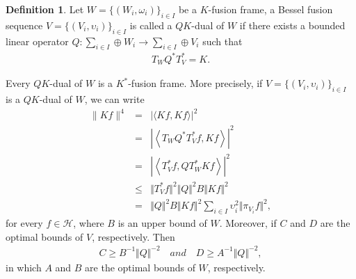 \documentclass{birkjour}
\theoremstyle{definition}
\newtheorem{defn}[thm]{Definition}
\theoremstyle{remark}
\numberwithin{equation}{section}
\begin{document}
\begin{defn}
Let  $W = \lbrace (W_{i}, \omega_{i})\rbrace_{i\in I}$   be a  $K$-fusion frame, 
 a Bessel fusion sequence $V=\lbrace(V_{i},\upsilon_{i})\rbrace_{i\in I}$ is called a  $QK$-dual of $W$ if there exists a bounded linear operator $Q:\sum_{i\in I}\oplus W_{i}\rightarrow \sum_{i\in I}\oplus V_{i}$ such that
\begin{eqnarray}\label{QK dual}
T_{W}Q^{*}T^{*}_{V} = K.
\end{eqnarray}
\end{defn}


Every   $QK$-dual of $W$
 is a $K^{*}$-fusion frame.
More precisely, if  $V=\lbrace(V_{i},\upsilon_{i})\rbrace_{i\in I}$ is  a $QK$-dual of $W$, we can write
\begin{eqnarray*}
\|Kf\|^{4} &=& |\langle Kf, Kf \rangle|^{2}\\
&=&  \left|\left\langle T_{W}Q^{*}T^{*}_{V} f, Kf\right\rangle\right|^{2}\\
&=& \left|\left\langle T^{*}_{V} f, QT_{W}^{*}Kf\right\rangle\right|^{2}\\
&\leq& \Vert T^{*}_{V} f \Vert^{2}  \Vert Q\Vert^{2}B\Vert  Kf \Vert^{2}\\
&=&\Vert Q\Vert^{2}B\Vert  Kf \Vert^{2}\sum_{i\in I}\upsilon_{i}^{2}\Vert \pi_{V_{i}}f\Vert^{2},
\end{eqnarray*}
 for every $f\in \mathcal{H}$, where $B$ is an upper bound of $W$.
 Moreover, if $C$ and $D$ are the optimal bounds of $V$, respectively. Then
\begin{eqnarray*}
C\geq B^{-1} \Vert Q\Vert^{-2} \quad  \textit{and} \quad
D\geq A^{-1} \Vert Q\Vert^{-2},
\end{eqnarray*}
in which $A$ and $B$ are  the optimal bounds of $W$, respectively. 
\end{document}
